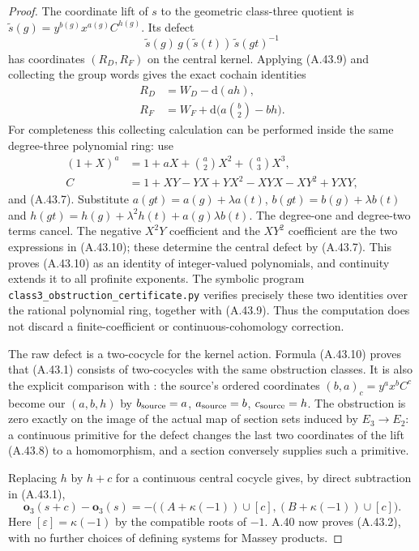 \begin{proof}
The coordinate lift of $s$ to the geometric class-three quotient
is $\widetilde s(g)=y^{b(g)}x^{a(g)}C^{h(g)}$.  Its defect
\[
 \widetilde s(g)\,g(\widetilde s(t))\,
                       \widetilde s(gt)^{-1}
\]
has coordinates $(R_D,R_F)$ on the central kernel.  Applying
(A.43.9) and collecting the group words gives the exact cochain
identities
\[
 \begin{split}
 R_D&=W_D-\mathrm d(ah),\\
 R_F&=W_F+\mathrm d\bigl(a\binom b2-bh\bigr).
 \end{split}
 \tag{A.43.10}
\]
For completeness this collecting calculation can be performed
inside the same degree-three polynomial ring: use
\[
 \begin{split}
 (1+X)^a&=1+aX+\binom a2X^2+\binom a3X^3,\\
 C&=1+XY-YX+YX^2-XYX-XY^2+YXY,
 \end{split}
\]
and (A.43.7).  Substitute
$a(gt)=a(g)+\lambda a(t)$,
$b(gt)=b(g)+\lambda b(t)$ and
$h(gt)=h(g)+\lambda^2h(t)+a(g)\lambda b(t)$.
The degree-one and degree-two terms cancel.  The negative
$X^2Y$ coefficient and the $XY^2$ coefficient are the two
expressions in (A.43.10); these determine the central defect
by (A.43.7).  This proves (A.43.10) as an identity of
integer-valued polynomials, and continuity extends it to all
profinite exponents.  The symbolic program
\texttt{class3\_obstruction\_certificate.py} verifies precisely
these two identities over the rational polynomial ring, together
with (A.43.9).  Thus the computation does not discard a
finite-coefficient or continuous-cohomology correction.

The raw defect is a two-cocycle for the kernel action.  Formula
(A.43.10) proves that (A.43.1) consists of two-cocycles with the
same obstruction classes.  It is also the explicit comparison
with \cite[Proposition 17 and Theorem 19]{BIR_Wickelgren2012}:
the source's ordered coordinates $(b,a)_c=y^a x^b C^c$ become
our $(a,b,h)$ by $b_{\rm source}=a$,
$a_{\rm source}=b$, $c_{\rm source}=h$.
The obstruction is zero exactly on the image of the actual
map of section sets induced by $E_3\to E_2$: a continuous
primitive for the defect changes the last two coordinates of
the lift (A.43.8) to a homomorphism, and a section conversely
supplies such a primitive.

Replacing $h$ by $h+c$ for a continuous central cocycle gives,
by direct subtraction in (A.43.1),
\[
 \mathbf o_3(s+c)-\mathbf o_3(s)
       =-\bigl((A+\kappa(-1))\cup[c],
               (B+\kappa(-1))\cup[c]\bigr).
 \tag{A.43.11}
\]
Here $[\varepsilon]=\kappa(-1)$ by the compatible roots of
$-1$.  A.40 now proves (A.43.2), with no further choices of
defining systems for Massey products.


\end{proof}
